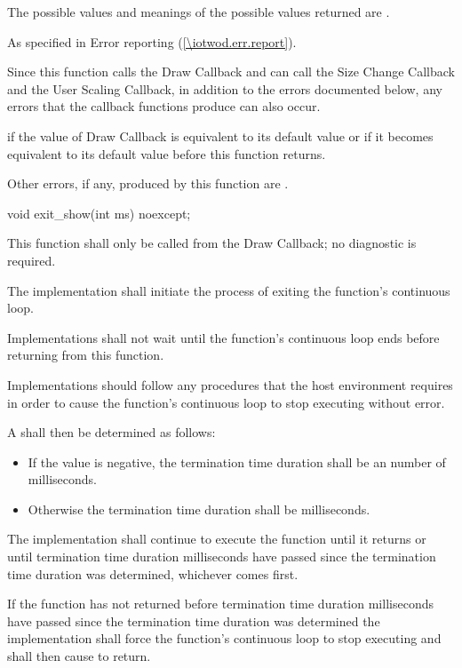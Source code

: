 \begin{itemdescr}
\pnum
\returns
The possible values and meanings of the possible values returned are .

\pnum
\throws
As specified in Error reporting (\ref{\iotwod.err.report}).

\pnum
\remarks
Since this function calls the Draw Callback and can call the Size Change Callback and the User Scaling Callback, in addition to the errors documented below, any errors that the callback functions produce can also occur.

\pnum
\errors
\pnum
{} if the value of Draw Callback is equivalent to its default value or if it becomes equivalent to its default value before this function returns.

\pnum
Other errors, if any, produced by this function are .
\end{itemdescr}

\begin{itemdecl}
void exit_show(int ms) noexcept;
\end{itemdecl}
\begin{itemdescr}
\pnum
\requires
This function shall only be called from the Draw Callback; no diagnostic is required.

\pnum
\effects
The implementation shall initiate the process of exiting the  function's continuous loop.

\pnum
Implementations shall not wait until the  function's continuous loop ends before returning from this function.

\pnum
Implementations should follow any procedures that the host environment requires in order to cause the  function's continuous loop to stop executing without error.

\pnum
A  shall then be determined as follows:
\begin{itemize}
\item If the value  is negative, the termination time duration shall be an \unspecnorm number of milliseconds.
\item Otherwise the termination time duration shall be  milliseconds.
\end{itemize}

\pnum
The implementation shall continue to execute the  function until it returns or until termination time duration milliseconds have passed since the termination time duration was determined, whichever comes first.

\pnum
If the  function has not returned before termination time duration milliseconds have passed since the termination time duration was determined the implementation shall force the  function's continuous loop to stop executing and shall then cause  to return.
\end{itemdescr}

